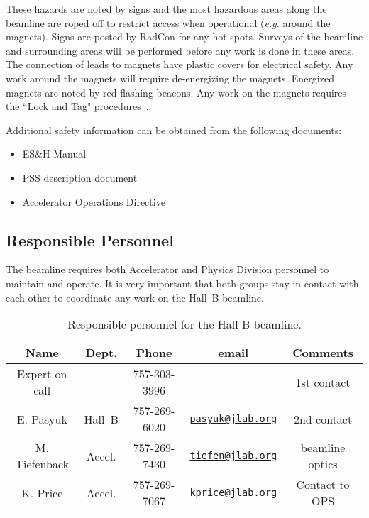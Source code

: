 These hazards are noted by signs and the most hazardous areas along the beamline are 
roped off to restrict access when operational ({\it e.g.} around the magnets). Signs are posted 
by RadCon for any hot spots. Surveys of the beamline and surrounding areas will be 
performed before any work is done in these areas. The connection of leads to magnets have 
plastic covers for electrical safety. Any work around the magnets will require 
de-energizing the magnets. Energized magnets are noted by red flashing beacons. Any work 
on the magnets requires the ``Lock and Tag" procedures~\cite{esh}.  

Additional safety information can be obtained from the following documents:
\begin{itemize}[label=$\circ$]

\item ES\&H Manual~\cite{esh} 

\item PSS description document~\cite{pss}

\item Accelerator Operations Directive~\cite{ops}

\end{itemize} 

\subsection{Responsible Personnel}

The beamline requires both Accelerator and Physics Division personnel to maintain and 
operate. It is very important that both groups stay in contact with each other to 
coordinate any work on the Hall~B beamline. 

\begin{table}[!ht]
\centering
\begin{tabular}{|c|c|c|c|c|} \hline
 Name&Dept.&Phone&email&Comments \\ \hline
Expert on call& &757-303-3996&& 1st contact \\ \hline
E. Pasyuk  & Hall~B&757-269-6020&\href{mailto:pasyuk@jlab.org}{\nolinkurl{pasyuk@jlab.org}}&2nd contact \\ \hline
M. Tiefenback & Accel.&757-269-7430&\href{mailto:tiefen@jlab.org}{\nolinkurl{tiefen@jlab.org}}& beamline optics\\ \hline
K. Price      & Accel.&757-269-7067&\href{mailto:kprice@jlab.org}{\nolinkurl{kprice@jlab.org}}&Contact to OPS \\ \hline
\end{tabular}
\caption{Responsible personnel for the Hall B beamline.} 
\label{tb:beam}
\end{table}

